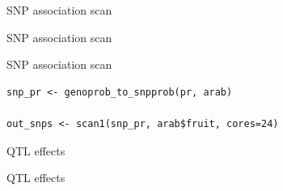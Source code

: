 \documentclass[12pt,t,aspectratio=1610]{beamer}
\begin{document}
\begin{frame}[c]{SNP association scan}


\end{frame}



\begin{frame}[c]{SNP association scan}


\end{frame}


\begin{frame}[c,fragile]{SNP association scan}

\begin{center} \begin{minipage}[c]{11.3cm} \begin{semiverbatim}
\begin{lstlisting}[linewidth=11.3cm]
snp_pr <- genoprob_to_snpprob(pr, arab)

out_snps <- scan1(snp_pr, arab$fruit, cores=24)
\end{lstlisting}
\end{semiverbatim} \end{minipage} \end{center}

\end{frame}





\begin{frame}[c]{QTL effects}


\end{frame}



\begin{frame}[c]{QTL effects}


\end{frame}
\end{document}
